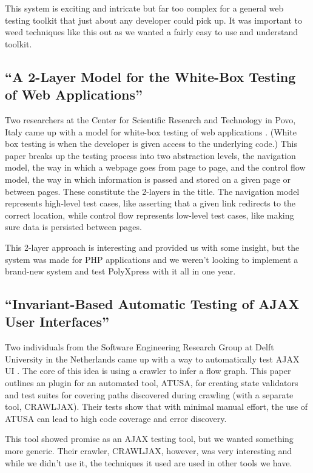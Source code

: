 \documentclass[12pt]{ucthesis}
\begin{document}
This system is exciting and intricate but far too complex for a general web testing toolkit that just about any developer could pick up. It was important to weed techniques like this out as we wanted a fairly easy to use and understand toolkit.

\subsection{``A 2-Layer Model for the White-Box Testing of Web Applications''}
Two researchers at the Center for Scientific Research and Technology in Povo, Italy came up with a model for white-box testing of web applications \cite{2LayerModel}. (White box testing is when the developer is given access to the underlying code.) This paper breaks up the testing process into two abstraction levels, the navigation model, the way in which a webpage goes from page to page, and the control flow model, the way in which information is passed and stored on a given page or between pages. These constitute the 2-layers in the title. The navigation model represents high-level test cases, like asserting that a given link redirects to the correct location, while control flow represents low-level test cases, like making sure data is persisted between pages. 

This 2-layer approach is interesting and provided us with some insight, but the system was made for PHP applications and we weren't looking to implement a brand-new system and test PolyXpress with it all in one year.

\subsection{``Invariant-Based Automatic Testing of AJAX User Interfaces''}
Two individuals from the Software Engineering Research Group at Delft University in the Netherlands came up with a way to automatically test AJAX UI \cite{InvariantBasedUseInterfaces}. The core of this idea is using a crawler to infer a flow graph. This paper outlines an plugin for an automated tool, ATUSA, for creating state validators and test suites for covering paths discovered during crawling (with a separate tool, CRAWLJAX). Their tests show that with minimal manual effort, the use of ATUSA can lead to high code coverage and error discovery. 

This tool showed promise as an AJAX testing tool, but we wanted something more generic. Their crawler, CRAWLJAX, however, was very interesting and while we didn't use it, the techniques it used are used in other tools we have.
\end{document}
